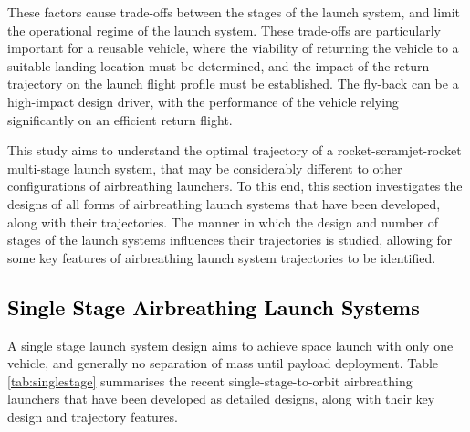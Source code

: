 These factors cause trade-offs between the stages of the launch system\cite{Staufenbiel2000}, and limit the operational regime of the launch system.
These trade-offs are particularly important for a reusable vehicle, where the viability of returning the vehicle to a suitable landing location must be determined, and the impact of the return trajectory on the launch flight profile must be established. The fly-back can be a high-impact design driver, with the performance of the vehicle relying significantly on an efficient return flight\cite{Tetlow1992,Hellman}. 

This study aims to understand the optimal trajectory of a rocket-scramjet-rocket multi-stage launch system, that may be considerably different to other configurations of airbreathing launchers. 
To this end, this section investigates the designs of all forms of airbreathing launch systems that have been developed, along with their trajectories. The manner in which the design and number of stages of the launch systems influences their trajectories is studied, allowing for some key features of airbreathing launch system trajectories to be identified.
  
 
  
 
  
 \textcolor{black}{
  \subsection{Single Stage Airbreathing Launch Systems}
}

\noindent
A single stage launch system design aims to achieve space launch with only one vehicle, and generally no separation of mass until payload deployment. Table \ref{tab:singlestage} summarises the recent single-stage-to-orbit airbreathing launchers that have been developed as detailed designs, along with their key design and trajectory features. 

